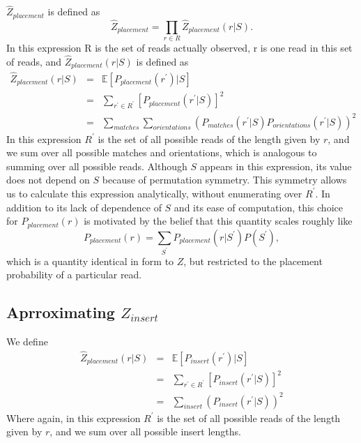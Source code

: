 \documentclass[phd,tocprelim]{cornell}
\begin{document}
$\hat{Z}_{placement}$ is defined as
\begin{equation}
    \hat{Z}_{placement} = \prod_{r \in R} \hat{Z}_{placement}(r|S).
\end{equation}
In this expression R is the set of reads actually observed, r is one read in this set of reads, and $\hat{Z}_{placement}(r|S)$ is defined as
\begin{equation}
    \begin{array}{lcl}
        \hat{Z}_{placement}(r|S) & = & \mathbb{E}\left[P_{placement}\left(r^{\prime}\right)|S\right] \\
        & = & \sum_{r^{\prime} \in R^{\prime}} \left[ P_{placement}(r^{\prime}|S)\right]^{2} \\
        & = & \sum_{matches} \sum_{orientations} \left(P_{matches}(r^{\prime}|S)P_{orientations}(r^{\prime}|S)\right)^{2}
    \end{array}
\end{equation}
In this expression $R^{\prime}$ is the set of all possible reads of the length given by $r$, and we sum over all possible matches and orientations, which is analogous to summing over all possible reads. Although $S$ appears in this expression, its value does not depend on $S$ because of permutation symmetry. This symmetry allows us to calculate this expression analytically, without enumerating over $R^{\prime}$.  In addition to its lack of dependence of $S$ and its ease of computation, this choice for $P_{placement}(r)$ is motivated by the belief that this quantity scales roughly like
\begin{equation}
    P_{placement}(r) = \sum_{S^{\prime}}P_{placement}(r|S^{\prime})P(S^{\prime}),
\end{equation}
which is a quantity identical in form to $Z$, but restricted to the placement probability of a particular read.


\subsection{Aprroximating $Z_{insert}$} %
\label{sub:Aprroximating Z_insert}

We define
\begin{equation}
    \begin{array}{lcl}
        \hat{Z}_{placement}(r|S) & = & \mathbb{E}\left[P_{insert}\left(r^{\prime}\right)|S\right] \\
        & = & \sum_{r^{\prime} \in R^{\prime}} \left[ P_{insert}(r^{\prime}|S)\right]^{2} \\
        & = & \sum_{insert} \left(P_{insert}(r^{\prime}|S)\right)^{2}
    \end{array}
\end{equation}
Where again, in this expression $R^{\prime}$ is the set of all possible reads of the length given by $r$, and we sum over all possible insert lengths.
\end{document}
